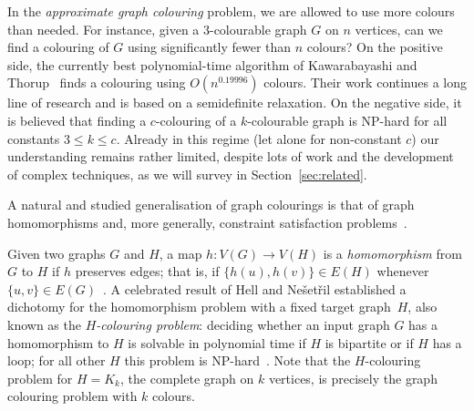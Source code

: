 \documentclass[11pt,a4paper]{scrartcl}
\numberwithin{theorem}{section}
\theoremstyle{definition}
\begin{document}
In the \emph{approximate graph colouring} problem, we are allowed to use more
colours than needed. For instance, given a $3$-colourable graph $G$ on $n$
vertices, can we find a colouring of $G$ using significantly fewer than $n$ colours?
On the positive side, the currently best polynomial-time algorithm of
Kawarabayashi and Thorup~\cite{Kawarabayashi17:jacm} finds a colouring using
$O(n^{0.19996})$ colours. Their work continues a long line of research and is
based on a semidefinite relaxation. On the negative side, it is believed that
finding a $c$-colouring of a $k$-colourable graph is NP-hard for all constants
$3\leq k\leq c$. Already in this regime (let alone for non-constant $c$) our
understanding remains rather limited, despite lots of work and the development
of complex techniques, as we will survey in Section~\ref{sec:related}.

A natural and studied generalisation of graph colourings is that of graph
homomorphisms and, more generally, constraint satisfaction
problems~\cite{Hell08:survey}.

Given two graphs $G$ and $H$, a map $h:V(G)\to V(H)$ is a \emph{homomorphism}
from $G$ to $H$ if $h$ preserves edges; that is, if $\{h(u),h(v)\}\in E(H)$
whenever $\{u,v\}\in E(G)$~\cite{hell2004homomorphism_book}. A celebrated result
of Hell and Ne\v{s}et\v{r}il established a dichotomy for the homomorphism
problem with a fixed target graph~$H$, also known as the \emph{$H$-colouring
problem}: deciding whether an input graph $G$ has a homomorphism to $H$ is
solvable in polynomial time if $H$ is bipartite or if $H$ has a loop; for all
other $H$ this problem is NP-hard~\cite{HellN90}. Note that the $H$-colouring
problem for $H=K_k$, the complete graph on $k$ vertices, is precisely the graph
colouring problem with $k$ colours.
\end{document}
